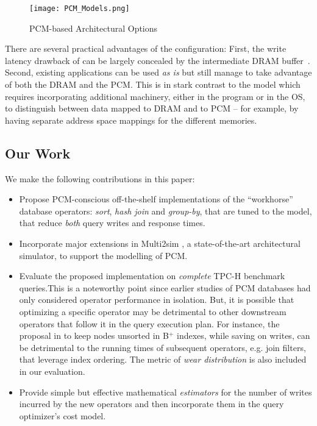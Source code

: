 \begin{figure}[htbp]
	\texttt{[image: PCM\_Models.png]}\centering
	\caption{PCM-based Architectural Options}
	\label{fig:pcm_models}
\end{figure}

There are several practical advantages of the \model{} configuration:
First, the write latency drawback of \modelPcmRam{} can be largely
concealed by the intermediate DRAM buffer~\cite{qureshi}. Second,
existing applications can be used \textit{as is} but still manage to take
advantage of both the DRAM and the PCM. This is in stark contrast to the
\modelExplicit{} model which requires incorporating additional machinery,
either in the program or in the OS, to distinguish between data mapped
to DRAM and to PCM -- for example, by having separate address space
mappings for the different memories.

\subsection*{Our Work}
We make the following contributions in this paper:
\begin{itemize}
\item Propose PCM-conscious off-the-shelf implementations of the ``workhorse'' database operators:
\textit{sort}, \textit{hash join} and \textit{group-by}, that are tuned to the \model{} model, that reduce
\emph{both} query writes and response times.

\item Incorporate major extensions in Multi2sim \cite{multi2sim},
a state-of-the-art architectural simulator, to support the modelling of PCM.  



\item Evaluate the proposed implementation on \emph{complete} TPC-H benchmark queries.This is a noteworthy point since earlier studies of PCM databases had only
considered operator performance in isolation.  But, it is possible that
optimizing a specific operator may be detrimental to other downstream
operators that follow it in the query execution plan. For instance,
the proposal in \cite{chen} to keep nodes unsorted in B$^+$ indexes,
while saving on writes, can be detrimental to the running times of
subsequent operators, e.g. join filters, that leverage index ordering. The metric of \emph{wear  distribution} is also included in our evaluation.


\item Provide simple but effective mathematical \emph{estimators} for the
number of writes incurred by the new operators and then incorporate them in the query optimizer's
cost model.

\end{itemize}

